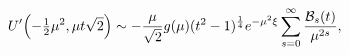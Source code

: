 \[\mathop{U\/}\nolimits'\!\left(-\tfrac{1}{2}\mu^{2},\mu t\sqrt{2}\right)\sim-%
\frac{\mu}{\sqrt{2}}g(\mu)(t^{2}-1)^{\frac{1}{4}}\*e^{-\mu^{2}\xi}\sum_{s=0}^{%
\infty}\frac{{\cal B}_{s}(t)}{\mu^{2s}},\]